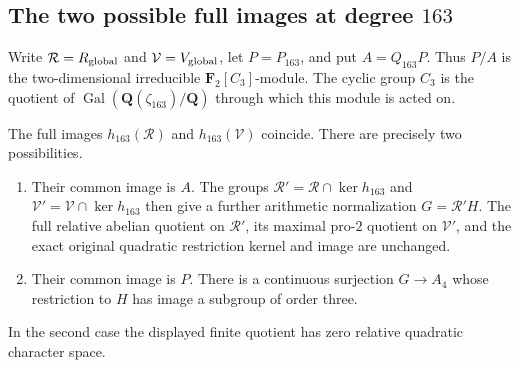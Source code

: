 \subsection{The two possible full images at degree \(163\)}
Write \(\mathcal R=R_{\rm global}\) and
\(\mathcal V=V_{\rm global}\), let \(P=P_{163}\), and put
\(A=Q_{163}P\).  Thus \(P/A\) is the two-dimensional irreducible
\(\mathbf F_2[C_3]\)-module.  The cyclic group \(C_3\) is the quotient
of \(\operatorname{Gal}(\mathbf Q(\zeta_{163})/\mathbf Q)\) through
which this module is acted on.

\begin{proposition}\label{prop:cm163-full-image-dichotomy}
The full images \(h_{163}(\mathcal R)\) and
\(h_{163}(\mathcal V)\) coincide.  There are precisely two
possibilities.
\begin{enumerate}
\item Their common image is \(A\).  The groups
\(\mathcal R'=\mathcal R\cap\ker h_{163}\) and
\(\mathcal V'=\mathcal V\cap\ker h_{163}\) then give a further
arithmetic normalization \(G=\mathcal R'H\).  The full relative
abelian quotient on \(\mathcal R'\), its maximal pro-\(2\) quotient
on \(\mathcal V'\), and the exact original quadratic restriction
kernel and image are unchanged.
\item Their common image is \(P\).  There is a continuous
surjection \(G\longrightarrow A_4\) whose restriction to \(H\)
has image a subgroup of order three.
\end{enumerate}
In the second case the displayed finite quotient has zero relative
quadratic character space.
\end{proposition}
